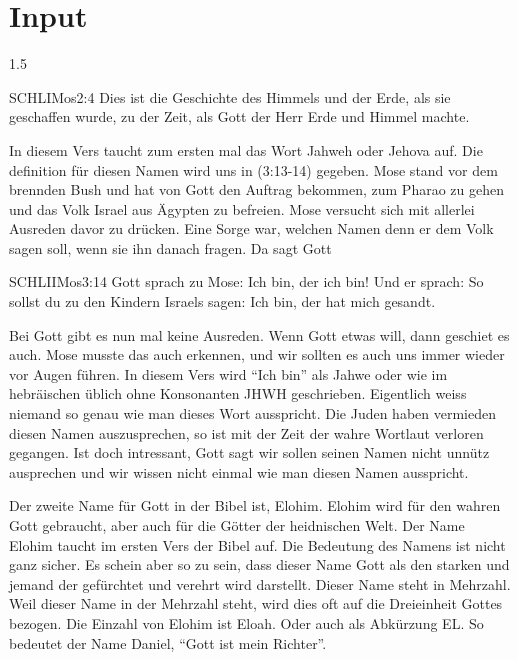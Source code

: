 \documentclass[fontsize=14pt]{../../inc/mybib}
\begin{document}
\section{ Input }
\begin{spacing}{1.5}
    \begin{block}
        \begin{bibelbox}{SCHL}{IMos}{2:4}
            Dies ist die Geschichte des Himmels und der Erde, als sie geschaffen wurde, zu der Zeit, als Gott der Herr Erde und Himmel machte.
        \end{bibelbox}
        In diesem Vers taucht zum ersten mal das Wort Jahweh oder Jehova auf. Die definition für diesen Namen wird uns in (3:13-14) gegeben. Mose stand vor dem brennden Bush und hat von Gott den Auftrag bekommen, zum Pharao zu gehen und das Volk Israel aus Ägypten zu befreien. Mose versucht sich mit allerlei Ausreden davor zu drücken. Eine Sorge war, welchen Namen denn er dem Volk sagen soll, wenn sie ihn danach fragen. Da sagt Gott
        \begin{bibelbox}{SCHL}{IIMos}{3:14}
            Gott sprach zu Mose: \flqq Ich bin, der ich bin!\frqq{} Und er sprach: \flqq So sollst du zu den Kindern Israels sagen: \flq Ich bin\frq, der hat mich gesandt.\frqq{}
        \end{bibelbox}
        Bei Gott gibt es nun mal keine Ausreden. Wenn Gott etwas will, dann geschiet es auch. Mose musste das auch erkennen, und wir sollten es auch uns immer wieder vor Augen führen.
        In diesem Vers wird \enquote{Ich bin} als Jahwe oder wie im hebräischen üblich ohne Konsonanten JHWH geschrieben. Eigentlich weiss niemand so genau wie man dieses Wort ausspricht. Die Juden haben vermieden diesen Namen auszusprechen, so ist mit der Zeit der wahre Wortlaut verloren gegangen. Ist doch intressant, Gott sagt wir sollen seinen Namen nicht unnütz ausprechen und wir wissen nicht einmal wie man diesen Namen ausspricht.

        Der zweite Name für Gott in der Bibel ist, Elohim. Elohim wird für den wahren Gott gebraucht, aber auch für die Götter der heidnischen Welt. Der Name Elohim taucht im ersten Vers der Bibel auf. Die Bedeutung des Namens ist nicht ganz sicher. Es schein aber so zu sein, dass dieser Name Gott als den starken und jemand der gefürchtet und verehrt wird darstellt. Dieser Name steht in Mehrzahl. Weil dieser Name in der Mehrzahl steht, wird dies oft auf die Dreieinheit Gottes bezogen. Die Einzahl von Elohim ist Eloah. Oder auch als Abkürzung EL. So bedeutet \zB{} der Name Daniel, \enquote{Gott ist mein Richter}.


\end{block}
\end{spacing}
\end{document}
